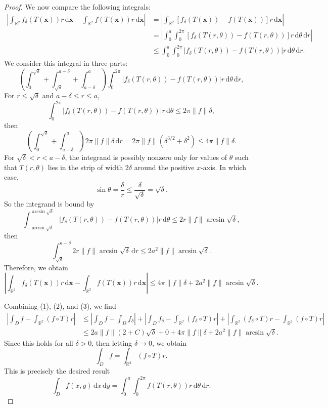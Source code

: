 \documentclass[12pt]{article}
\newcommand{\R}{\mathbb{R}}
\newcommand{\<}{\langle}
\renewcommand{\>}{\rangle}
\newcommand{\x}{\mathbf{x}}
\newcommand{\dd}[1]{\,\mathrm{d}#1}
\begin{document}
\begin{proof}
    We now compare the following integrals:
    \begin{align*}
        \left| \int_{\R^2} f_\delta(T(\x)) r \dd{\x} - \int_{\R^2} f(T(\x)) r \dd{\x} \right|
            &= \left| \int_{\R^2} [f_\delta(T(\x)) - f(T(\x))] r \dd{\x} \right| \\
            &= \left| \int_{0}^{a} \int_{0}^{2\pi} [f_\delta(T(r, \theta)) - f(T(r, \theta))]r \dd{\theta} \dd{r} \right| \\
            &\leq \int_{0}^{a} \int_{0}^{2\pi} |f_\delta(T(r, \theta)) - f(T(r, \theta))|r \dd{\theta} \dd{r}.
    \end{align*}
    We consider this integral in three parts:
    \[
        \left(\int_{0}^{\sqrt{\delta}} + \int_{\sqrt{\delta}}^{a - \delta} + \int_{a - \delta}^{a} \right)\int_{0}^{2\pi} |f_\delta(T(r, \theta)) - f(T(r, \theta))|r \dd{\theta} \dd{r},
    \]
    For $r \leq \sqrt{\delta}$ and $a - \delta \leq r \leq a$, 
    \[
        \int_{0}^{2\pi} |f_\delta(T(r, \theta)) - f(T(r, \theta))|r \dd{\theta}
            \leq 2\pi\|f\|\delta,
    \]
    then
    \[
        \left(\int_{0}^{\sqrt{\delta}} + \int_{a - \delta}^{a} \right) 2\pi\|f\|\delta \dd{r}
            = 2\pi\|f\|(\delta^{3/2} + \delta^2)
            \leq 4\pi\|f\|\delta.
    \]
    For $\sqrt{\delta} < r < a - \delta$, the integrand is possibly nonzero only for values of $\theta$ such that $T(r, \theta)$ lies in the strip of width $2\delta$ around the positive $x$-axis. In which case,
    \[
        \sin \theta = \frac{\delta}{r} \leq \frac{\delta}{\sqrt{\delta}} = \sqrt{\delta}.
    \]
    So the integrand is bound by
    \[
        \int_{-\arcsin\sqrt{\delta}}^{\arcsin\sqrt{\delta}} |f_\delta(T(r, \theta)) - f(T(r, \theta))|r \dd{\theta}
            \leq 2r\|f\|\arcsin\sqrt{\delta},
    \]
    then
    \[
        \int_{\sqrt{\delta}}^{a - \delta} 2r\|f\|\arcsin\sqrt{\delta} \dd{r} \leq 2a^2\|f\|\arcsin\sqrt{\delta}.
    \]
    Therefore, we obtain
    \[
        \left| \int_{\R^2} f_\delta(T(\x)) r \dd{\x} - \int_{\R^2} f(T(\x)) r \dd{\x} \right|
            \leq 4\pi\|f\|\delta + 2a^2\|f\|\arcsin\sqrt{\delta}.
        \tag{3}
    \]

    Combining (1), (2), and (3), we find
    \begin{align*}
        \left| \int_{D}\!\! f - \int_{\R^2}\!\! (f \circ T)r \right|
            &\leq \left| \int_{D}\!\! f - \int_{D}\!\! f_\delta \right|
                    + \left| \int_{D}\!\! f_\delta - \int_{\R^2}\!\! (f_\delta \circ T)r \right|
                    + \left| \int_{\R^2}\!\! (f_\delta \circ T)r - \int_{\R^2}\!\! (f \circ T)r \right| \\
            &\leq 2a\|f\|(2 + C)\sqrt{\delta} + 0 +  4\pi\|f\|\delta + 2a^2\|f\|\arcsin\sqrt{\delta}.
    \end{align*}
    Since this holds for all $\delta > 0$, then letting $\delta \to 0$, we obtain
    \[
        \int_{D} f = \int_{\R^2} (f \circ T)r.
    \]
    This is precisely the desired result
    \[
        \int_D f(x,y) \dd{x}\dd{y} = \int_{0}^{a} \int_{0}^{2\pi} f(T(r,\theta))r \dd{\theta} \dd{r}.
    \]



\end{proof}
\end{document}
